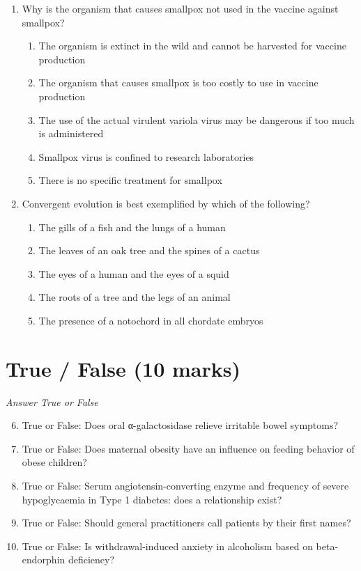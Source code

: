 \documentclass[12pt]{article}
\begin{document}
\begin{enumerate}[label=\arabic*.]
\begin{enumerate}[label=(\alph*)]
    \item Shoot apical meristem formation occurs after seed formation.
    \item Precursors of all three plant tissue systems are formed during embryogenesis.
\end{enumerate}
\item Why is the organism that causes smallpox not used in the vaccine against smallpox?
\begin{enumerate}[label=(\alph*)]
    \item The organism is extinct in the wild and cannot be harvested for vaccine production
    \item The organism that causes smallpox is too costly to use in vaccine production
    \item The use of the actual virulent variola virus may be dangerous if too much is administered
    \item Smallpox virus is confined to research laboratories
    \item There is no specific treatment for smallpox
\end{enumerate}
\item Convergent evolution is best exemplified by which of the following?
\begin{enumerate}[label=(\alph*)]
    \item The gills of a fish and the lungs of a human
    \item The leaves of an oak tree and the spines of a cactus
    \item The eyes of a human and the eyes of a squid
    \item The roots of a tree and the legs of an animal
    \item The presence of a notochord in all chordate embryos
\end{enumerate}
\end{enumerate}

\section*{True / False (10 marks)}
\textit{Answer True or False}
\begin{enumerate}[label=\arabic*.]
\setcounter{enumi}{5}
\item True or False: Does oral α-galactosidase relieve irritable bowel symptoms?
\item True or False: Does maternal obesity have an influence on feeding behavior of obese children?
\item True or False: Serum angiotensin-converting enzyme and frequency of severe hypoglycaemia in Type 1 diabetes: does a relationship exist?
\item True or False: Should general practitioners call patients by their first names?
\item True or False: Is withdrawal-induced anxiety in alcoholism based on beta-endorphin deficiency?
\end{enumerate}
\end{document}

